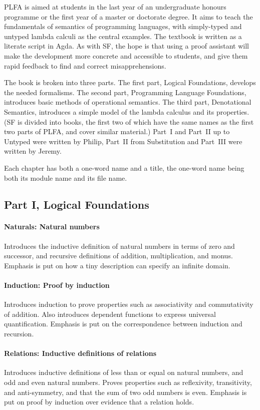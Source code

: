 \documentclass[preprint,authoryear]{elsarticle}
\begin{document}
PLFA is aimed at students in the last year of an undergraduate
honours programme or the first year of a master or doctorate degree.
It aims to teach the fundamentals of semantics of
programming languages, with simply-typed and untyped lambda calculi as the
central examples.  The textbook is written as a literate script in Agda.
As with SF, the hope is that using
a proof assistant will make the development more concrete
and accessible to students, and give them rapid feedback to find
and correct misapprehensions.

The book is broken into three parts. The first part, Logical Foundations,
develops the needed formalisms.  The second part, Programming Language
Foundations, introduces basic methods of operational semantics.
The third part, Denotational Semantics, introduces a simple
model of the lambda calculus and its properties.
(SF is divided into books, the first two of which have the same names
as the first two parts of PLFA, and cover similar material.)
Part~I and Part~II up to Untyped were written by Philip,
Part~II from Substitution and Part~III were written by Jeremy.

Each chapter has both a one-word name and a title, the one-word name
being both its module name and its file name.

\subsection*{Part I, Logical Foundations}

\paragraph{Naturals: Natural numbers}
Introduces the inductive definition of natural numbers in terms of
zero and successor, and recursive definitions of addition,
multiplication, and monus. Emphasis is put on how a tiny description
can specify an infinite domain.

\paragraph{Induction: Proof by induction}
Introduces induction to prove properties
such as associativity and commutativity of addition.
Also introduces dependent functions to express universal quantification.
Emphasis is put on the correspondence between induction and recursion.

\paragraph{Relations: Inductive definitions of relations}
Introduces inductive definitions of less than or equal on natural numbers,
and odd and even natural numbers.
Proves properties such as reflexivity, transitivity, and
anti-symmetry, and that the sum of two odd numbers is even.
Emphasis is put on proof by induction over evidence that a relation holds.
\end{document}

